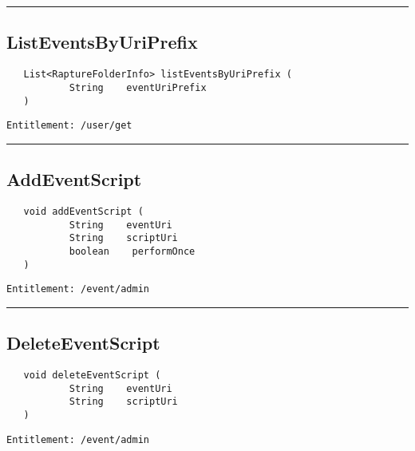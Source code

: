 \rule{12cm}{2pt}
\subsection{ListEventsByUriPrefix}
\label{Api:ListEventsByUriPrefix}
\begin{Verbatim}
   List<RaptureFolderInfo> listEventsByUriPrefix (
           String    eventUriPrefix
   )
\end{Verbatim}
\begin{Verbatim}[formatcom=\color{Maroon}]
  Entitlement: /user/get
\end{Verbatim}



\rule{12cm}{2pt}
\subsection{AddEventScript}
\label{Api:AddEventScript}
\begin{Verbatim}
   void addEventScript (
           String    eventUri
           String    scriptUri
           boolean    performOnce
   )
\end{Verbatim}
\begin{Verbatim}[formatcom=\color{Maroon}]
  Entitlement: /event/admin
\end{Verbatim}



\rule{12cm}{2pt}
\subsection{DeleteEventScript}
\label{Api:DeleteEventScript}
\begin{Verbatim}
   void deleteEventScript (
           String    eventUri
           String    scriptUri
   )
\end{Verbatim}
\begin{Verbatim}[formatcom=\color{Maroon}]
  Entitlement: /event/admin
\end{Verbatim}



